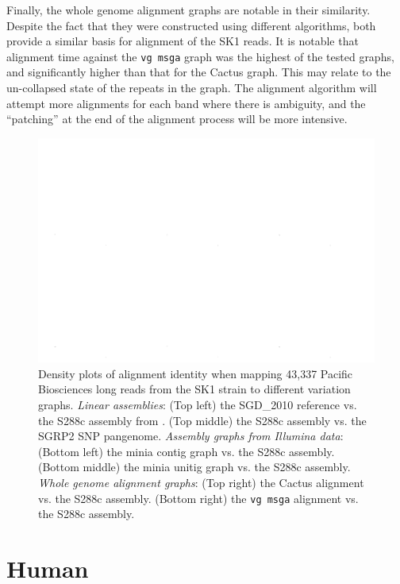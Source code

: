 Finally, the whole genome alignment graphs are notable in their similarity.
Despite the fact that they were constructed using different algorithms, both provide a similar basis for alignment of the SK1 reads.
It is notable that alignment time against the {\tt vg msga} graph was the highest of the tested graphs, and significantly higher than that for the Cactus graph.
This may relate to the un-collapsed state of the repeats in the graph.
The alignment algorithm will attempt more alignments for each band where there is ambiguity, and the ``patching'' at the end of the alignment process will be more intensive.

\begin{figure}[htbp!]
  \includegraphics[width=1.0\textwidth]{Chapter3/Figs/montage_vs_S288c_3x2.png}
  \caption[Long read alignment against various \emph{S. cerevisiae} pangenome graphs]{Density plots of alignment identity when mapping 43,337 Pacific Biosciences long reads from the SK1 strain to different variation graphs.
    \emph{Linear assemblies}:
    (Top left) the SGD\_2010 reference vs. the S288c assembly from \cite{yue2017contrasting}.
    (Top middle) the S288c assembly vs. the SGRP2 SNP pangenome.
    \emph{Assembly graphs from Illumina data}:
    (Bottom left) the minia contig graph vs. the S288c assembly.
    (Bottom middle) the minia unitig graph vs. the S288c assembly.
    \emph{Whole genome alignment graphs}:
    (Top right) the Cactus alignment vs. the S288c assembly.
    (Bottom right) the {\tt vg msga} alignment vs. the S288c assembly.
  }
  \label{fig:pacbio_yeast}
\end{figure}


\section{Human}

